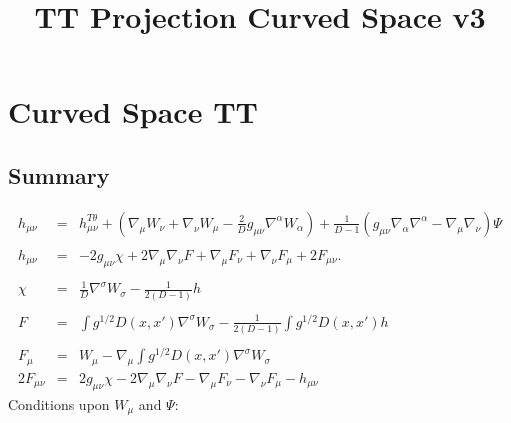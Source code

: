 \documentclass[10pt,letterpaper]{article}
\title{TT Projection Curved Space v3}
\date{}
\numberwithin{equation}{section}
\begin{document}
 
\maketitle
\noindent 

\section{Curved Space TT}
%
%
\subsection{Summary}
%
%
\begin{eqnarray}
h_{\mu\nu} &=& h_{\mu\nu}^{T\theta} + \left(\nabla_\mu W_\nu + \nabla_\nu W_\mu - \frac{2}{D}g_{\mu\nu}\nabla^\alpha W_\alpha\right) +\frac{1}{D-1}\left( g_{\mu\nu}\nabla_\alpha \nabla^\alpha - \nabla_\mu\nabla_\nu\right)\Psi
\\  \nonumber\\
h_{\mu\nu} &=& -2g_{\mu\nu}\chi + 2\nabla_\mu\nabla_\nu F + \nabla_\mu F_\nu + \nabla_\nu F_\mu + 2F_{\mu\nu}.
\\ \nonumber\\
\chi &=& \frac{1}{D}\nabla^\sigma W_{\sigma}  - \frac{1}{2(D-1)}h
\\ \nonumber\\
F &=& \int g^{1/2} D(x,x') \nabla^\sigma W_{\sigma}  - \frac{1}{2(D-1)}\int g^{1/2} D(x,x') h
\\ \nonumber\\
F_{\mu} &=& W_{\mu} -\nabla_\mu \int g^{1/2} D(x,x')\nabla^{\sigma}W_\sigma
\nonumber\\
2F_{\mu\nu} &=& 2g_{\mu\nu}\chi - 2\nabla_\mu\nabla_\nu F - \nabla_\mu F_\nu - \nabla_\nu F_{\mu} - h_{\mu\nu} 
\end{eqnarray}
Conditions upon $W_\mu$ and $\Psi$:
\end{document}
